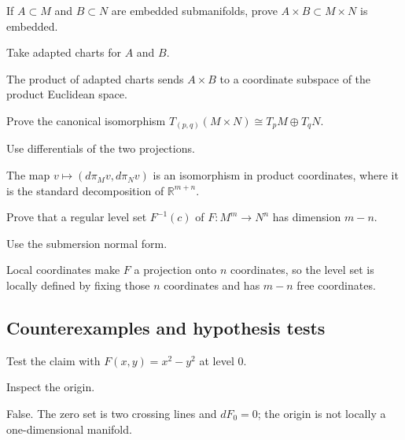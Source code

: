 \begin{exercise}\label{exr:vii06-ped-07}
If \(A\subset M\) and \(B\subset N\) are embedded submanifolds, prove \(A\times B\subset M\times N\) is embedded.
\end{exercise}
\begin{hint}
Take adapted charts for \(A\) and \(B\).
\end{hint}
\begin{solution}
The product of adapted charts sends \(A\times B\) to a coordinate subspace of the product Euclidean space.
\end{solution}

\begin{exercise}\label{exr:vii06-ped-08}
Prove the canonical isomorphism \(T_{(p,q)}(M\times N)\cong T_pM\oplus T_qN\).
\end{exercise}
\begin{hint}
Use differentials of the two projections.
\end{hint}
\begin{solution}
The map \(v\mapsto(d\pi_Mv,d\pi_Nv)\) is an isomorphism in product coordinates, where it is the standard decomposition of \(\mathbb R^{m+n}\).
\end{solution}

\begin{exercise}\label{exr:vii06-ped-09}
Prove that a regular level set \(F^{-1}(c)\) of \(F:M^m\to N^n\) has dimension \(m-n\).
\end{exercise}
\begin{hint}
Use the submersion normal form.
\end{hint}
\begin{solution}
Local coordinates make \(F\) a projection onto \(n\) coordinates, so the level set is locally defined by fixing those \(n\) coordinates and has \(m-n\) free coordinates.
\end{solution}

\subsection*{Counterexamples and hypothesis tests}

\begin{exercise}\label{exr:vii06-ped-10}
Test the claim with \(F(x,y)=x^2-y^2\) at level \(0\).
\end{exercise}
\begin{hint}
Inspect the origin.
\end{hint}
\begin{solution}
False.  The zero set is two crossing lines and \(dF_0=0\); the origin is not locally a one-dimensional manifold.
\end{solution}

